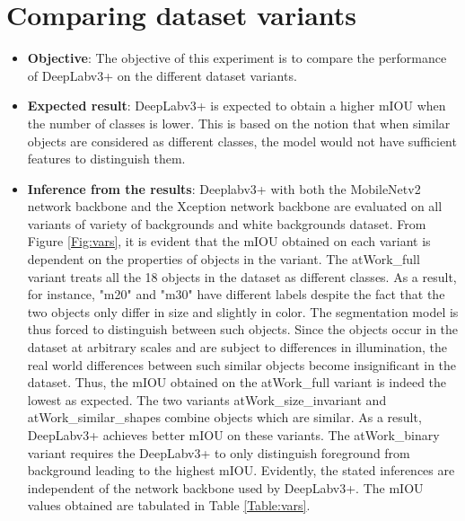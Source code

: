 \section{Comparing dataset variants}
\label{section:variants}

	\begin{itemize}
		\item \textbf{Objective}: The objective of this experiment is to compare the performance of DeepLabv3+ on the different dataset variants.
		\item \textbf{Expected result}: DeepLabv3+ is expected to obtain a higher mIOU when the number of classes is lower. This is based on the notion that when similar objects are considered as different classes, the model would not have sufficient features to distinguish them.
		\item \textbf{Inference from the results}: Deeplabv3+ with both the MobileNetv2 network backbone and the Xception network backbone are evaluated on all variants of variety of backgrounds and white backgrounds dataset. From Figure \ref{Fig:vars}, it is evident that the mIOU obtained on each variant is dependent on the properties of objects in the variant. The atWork\_full variant treats all the 18 objects in the dataset as different classes. As a result, for instance, "m20" and "m30" have different labels despite the fact that the two objects only differ in size and slightly in color. The segmentation model is thus forced to distinguish between such objects. Since the objects occur in the dataset at arbitrary scales and are subject to differences in illumination, the real world differences between such similar objects become insignificant in the dataset. Thus, the mIOU obtained on the atWork\_full variant is indeed the lowest as expected. The two variants atWork\_size\_invariant and atWork\_similar\_shapes combine objects which are similar. As a result, DeepLabv3+ achieves better mIOU on these variants. The atWork\_binary variant requires the DeepLabv3+ to only distinguish foreground from background leading to the highest mIOU. Evidently, the stated inferences are independent of the network backbone used by DeepLabv3+. The mIOU values obtained are tabulated in Table \ref{Table:vars}.
	\end{itemize}
	
